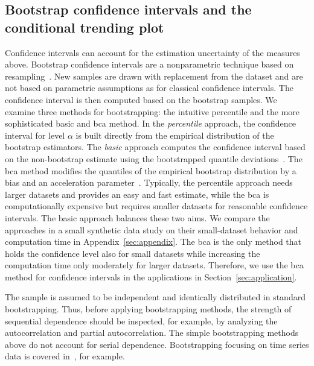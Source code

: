 \subsection{Bootstrap confidence intervals and the conditional trending plot}\label{subsec:trending-cond-prob}
Confidence intervals can account for the estimation uncertainty of the measures above.
Bootstrap confidence intervals are a nonparametric technique based on resampling~\parencite[for introductions see][]{Hesterberg2011,Bittmann2021}.
New samples are drawn with replacement from the dataset and are not based on parametric assumptions as for classical confidence intervals.
The confidence interval is then computed based on the bootstrap samples.
We examine three methods for bootstrapping: the intuitive percentile and the more sophisticated basic and \ac{bca} method.
In the \textit{percentile} approach, the confidence interval for level $\alpha$ is built directly from the empirical distribution of the bootstrap estimators.
The \textit{basic} approach computes the confidence interval based on the non-bootstrap estimate using the bootstrapped quantile deviations~\parencite{Davison1997}.
The \ac{bca} method modifies the quantiles of the empirical bootstrap distribution by a bias and an acceleration parameter~\parencite{Efron1987}.
Typically, the percentile approach needs larger datasets and provides an easy and fast estimate, while the \ac{bca} is computationally expensive but requires smaller datasets for reasonable confidence intervals.
The basic approach balances these two aims.
We compare the approaches in a small synthetic data study on their small-dataset behavior and computation time in Appendix~\ref{sec:appendix}.
The \ac{bca} is the only method that holds the confidence level also for small datasets while increasing the computation time only moderately for larger datasets.
Therefore, we use the \ac{bca} method for confidence intervals in the applications in Section~\ref{sec:application}.

The sample is assumed to be independent and identically distributed in standard bootstrapping.
Thus, before applying bootstrapping methods, the strength of sequential dependence should be inspected, for example, by analyzing the autocorrelation and partial autocorrelation.
The simple bootstrapping methods above do not account for serial dependence. 
Bootstrapping focusing on time series data is covered in~\textcite{Hardle2003,Kreiss2012}, for example.

